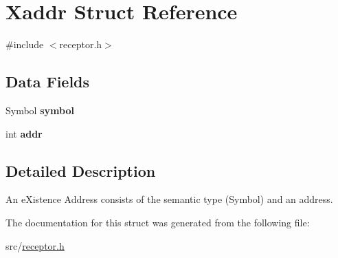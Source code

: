 \hypertarget{structXaddr}{\section{Xaddr Struct Reference}
\label{structXaddr}
}


{\ttfamily \#include $<$receptor.\+h$>$}

\subsection*{Data Fields}
\begin{DoxyCompactItemize}
\item 
\hypertarget{structXaddr_a429b38f8f57ab372da80e98fc4779005}{Symbol {\bfseries symbol}}\label{structXaddr_a429b38f8f57ab372da80e98fc4779005}

\item 
\hypertarget{structXaddr_ac8d1cbd8cb612f491f6271d3bbdaf325}{int {\bfseries addr}}\label{structXaddr_ac8d1cbd8cb612f491f6271d3bbdaf325}

\end{DoxyCompactItemize}


\subsection{Detailed Description}
An e\+Xistence Address consists of the semantic type (Symbol) and an address. 

The documentation for this struct was generated from the following file\+:\begin{DoxyCompactItemize}
\item 
src/\hyperlink{receptor_8h}{receptor.\+h}\end{DoxyCompactItemize}
